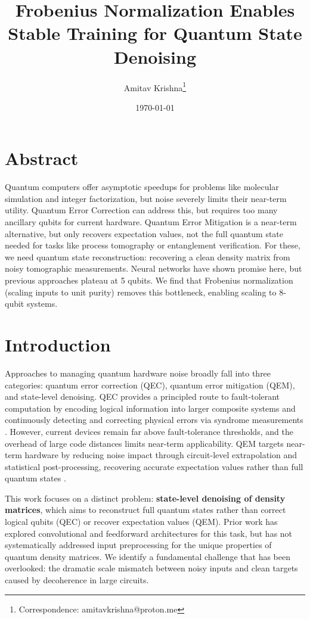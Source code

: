 \documentclass[11pt]{article}
\author{Amitav Krishna\thanks{Correspondence: amitavkrishna@proton.me}}
\date{\today}
\title{Frobenius Normalization Enables Stable Training for Quantum State Denoising}
\begin{document}
\maketitle
\section{Abstract}
\label{sec:org2eeead3}
Quantum computers offer asymptotic speedups for problems like molecular simulation and integer factorization, but noise severely limits their near-term utility.  Quantum Error Correction can address this, but requires too many ancillary qubits for current hardware.  Quantum Error Mitigation is a near-term alternative, but only recovers expectation values, not the full quantum state needed for tasks like process tomography or entanglement verification.  For these, we need quantum state reconstruction: recovering a clean density matrix from noisy tomographic measurements.  Neural networks have shown promise here, but previous approaches plateau at 5 qubits.  We find that Frobenius normalization (scaling inputs to unit purity) removes this bottleneck, enabling scaling to 8-qubit systems. 
\section{Introduction}
\label{sec:orgb5fbf81}

Approaches to managing quantum hardware noise broadly fall into three categories: quantum error correction (QEC), quantum error mitigation (QEM), and state-level denoising. QEC provides a principled route to fault-tolerant computation by encoding logical information into larger composite systems and continuously detecting and correcting physical errors via syndrome measurements \autocites{Bravyi_2024}[][]{202509.2149}. However, current devices remain far above fault-tolerance thresholds, and the overhead of large code distances limits near-term applicability. QEM targets near-term hardware by reducing noise impact through circuit-level extrapolation and statistical post-processing, recovering accurate expectation values rather than full quantum states \autocites{RevModPhys.95.045005}[][]{Bultrini_2023}.

This work focuses on a distinct problem: \textbf{state-level denoising of density matrices}, which aims to reconstruct full quantum states rather than correct logical qubits (QEC) or recover expectation values (QEM). Prior work has explored convolutional \autocite{kendre2025machinelearningquantumnoise} and feedforward \autocite{Morgillo_2024} architectures for this task, but has not systematically addressed input preprocessing for the unique properties of quantum density matrices. We identify a fundamental challenge that has been overlooked: the dramatic scale mismatch between noisy inputs and clean targets caused by decoherence in large circuits.
\end{document}
